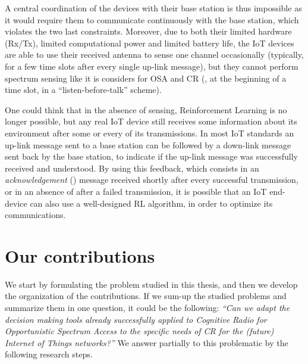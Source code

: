 A central coordination of the devices with their base station is thus impossible as it would require them to communicate continuously with the base station, which violates the two last constraints.
%
Moreover, due to both their limited hardware (Rx/Tx), limited computational power and limited battery life, the IoT devices are able to use their received antenna to sense one channel occasionally (typically, for a few time slots after every single up-link message), but they cannot perform spectrum sensing like it is considers for OSA and CR (\ie, at the beginning of a time slot, in a ``listen-before-talk'' scheme).

One could think that in the absence of sensing, Reinforcement Learning is no longer possible, but any real IoT device still receives some information about its environment after some or every of its transmissions.
In most IoT standards an up-link message sent to a base station can be followed by a down-link message sent back by the base station, to indicate if the up-link message was successfully received and understood.
%
By using this feedback, which consists in an \emph{acknowledgement} (\Ack) message received shortly after every successful transmission, or in an absence of \Ack{} after a failed transmission, it is possible that an IoT end-device can also use a well-designed RL algorithm, in order to optimize its communications.
%


\section{Our contributions}
\label{sec:1:contributions}

We start by formulating the problem studied in this thesis, and then we develop the organization of the contributions.
%
%
If we sum-up the studied problems and summarize them in one question, it could be the following:
\emph{``Can we adapt the decision making tools already successfully applied to Cognitive Radio for Opportunistic Spectrum Access to the specific needs of CR for the (future) Internet of Things networks?''}
%
We answer partially to this problematic by the following research steps.


